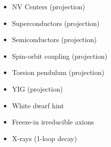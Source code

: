 \documentclass[8pt,twocolumn]{extarticle}
\begin{document}
\begin{mdframed}
\begin{itemize}
    	\item NV Centers (projection)~\cite{Chigusa:2023hms}
    	\item Superconductors (projection)~\cite{Hochberg:2016ajh}
  	\item Semiconductors (projection)~\cite{Hochberg:2016sqx}
  	\item Spin-orbit coupling (projection)~\cite{Chen:2022pyd}
  	\item Torsion pendulum (projection)~\cite{Graham:2017ivz}
  	  	\item YIG (projection)~\cite{Chigusa:2020gfs}
  	\item White dwarf hint~\cite{Giannotti:2017hny}
  	\item Freeze-in irreducible axions~\cite{Langhoff:2022bij}
  	\item X-rays (1-loop decay)~\cite{Ferreira:2022egk}
\end{itemize}
\end{mdframed}
\end{document}
